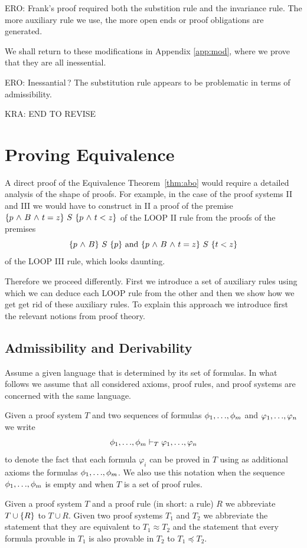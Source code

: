 \documentclass[runningheads]{llncs}       %
\begin{document}
ERO: Frank's proof required both the substition rule and the
invariance rule. The more auxiliary rule we use, the more open ends
or proof obligations are generated. 

\III

We shall return to these modifications in Appendix \ref{app:mod},
where we prove that they are all inessential. 

ERO: Inessantial\,?  The substitution rule appears to be problematic
in terms of admissibility.


KRA: END TO REVISE

\section{Proving Equivalence}

A direct proof of the Equivalence Theorem~\ref{thm:abo} would require a detailed
analysis of the shape of proofs. For example, in the case of the proof
systems II and III we would have to construct in II a proof of the premise
$ \mbox{$\{{p \mbox{$\ \wedge\ $} B \mbox{$\ \wedge\ $} t=z}\}\ {S}\ \{{p \mbox{$\ \wedge\ $} t<z}\}$}$ of the LOOP II rule from the proofs
of the premises 
\[
 \mbox{$\{{p \mbox{$\ \wedge\ $} B}\}\ {S}\ \{{p}\}$} \mbox{ and } \mbox{$\{{p \mbox{$\ \wedge\ $} B \mbox{$\ \wedge\ $} t=z}\}\ {S}\ \{{t<z}\}$}
\]
of the LOOP III rule, which looks daunting.

Therefore we proceed differently. First we introduce a set of
auxiliary rules using which we can deduce each LOOP rule from the
other and then we show how we get get rid of these auxiliary rules.
To explain this approach we introduce first the relevant notions from
proof theory.


\subsection{Admissibility and Derivability}

Assume a given language that is determined by its set of formulas.  In
what follows we assume that all considered axioms, proof rules, and
proof systems are concerned with the same language.

Given a proof system $T$ and two sequences of formulas
$\phi_1, \mbox{$\ldots$}, \phi_m$ and $\varphi_1, \mbox{$\ldots$}, \varphi_n$ we write
\[
  \phi_1, \mbox{$\ldots$}, \phi_m \vdash_T \varphi_1, \mbox{$\ldots$}, \varphi_n
\]
to denote the fact that each formula $\varphi_i$ can be proved in
$T$ using as additional axioms the formulas
$\phi_1, \mbox{$\ldots$}, \phi_m$.  We also use this notation when the sequence
$\phi_1, \mbox{$\ldots$}, \phi_m$ is empty and when $T$ is a set of proof
rules.

Given a proof system $T$ and a proof rule (in short: a rule) $R$ we
abbreviate $T \cup \mbox{$\{{R}\}$}$ to $T \cup R$. Given two proof systems $T_1$
and $T_2$ we abbreviate the statement that they are equivalent to
$T_1 \approx T_2$ and the statement that every formula provable in
$T_1$ is also provable in $T_2$ to $T_1 \preceq T_2$.
\end{document}
